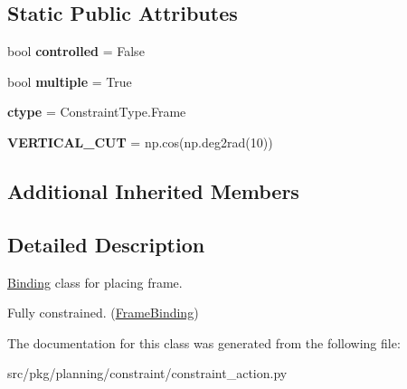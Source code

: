 \subsection*{Static Public Attributes}
\begin{DoxyCompactItemize}
\item 
\mbox{\label{classrnb-planning_1_1src_1_1pkg_1_1planning_1_1constraint_1_1constraint__action_1_1_place_frame_aff640b714e8d03af68bf1d1a40e56e12}} 
bool {\bfseries controlled} = False
\item 
\mbox{\label{classrnb-planning_1_1src_1_1pkg_1_1planning_1_1constraint_1_1constraint__action_1_1_place_frame_acfbfe54248a2af6f90a3c680a848804b}} 
bool {\bfseries multiple} = True
\item 
\mbox{\label{classrnb-planning_1_1src_1_1pkg_1_1planning_1_1constraint_1_1constraint__action_1_1_place_frame_a80c552f01cf371714add80f65d79be6a}} 
{\bfseries ctype} = Constraint\+Type.\+Frame
\item 
\mbox{\label{classrnb-planning_1_1src_1_1pkg_1_1planning_1_1constraint_1_1constraint__action_1_1_place_frame_ae4ca3b9c75f03c3dfceade4e32bbb183}} 
{\bfseries V\+E\+R\+T\+I\+C\+A\+L\+\_\+\+C\+UT} = np.\+cos(np.\+deg2rad(10))
\end{DoxyCompactItemize}
\subsection*{Additional Inherited Members}


\subsection{Detailed Description}
\hyperlink{classrnb-planning_1_1src_1_1pkg_1_1planning_1_1constraint_1_1constraint__action_1_1_binding}{Binding} class for placing frame. 

Fully constrained. (\hyperlink{classrnb-planning_1_1src_1_1pkg_1_1planning_1_1constraint_1_1constraint__action_1_1_frame_binding}{Frame\+Binding}) 

The documentation for this class was generated from the following file\+:\begin{DoxyCompactItemize}
\item 
src/pkg/planning/constraint/constraint\+\_\+action.\+py\end{DoxyCompactItemize}
